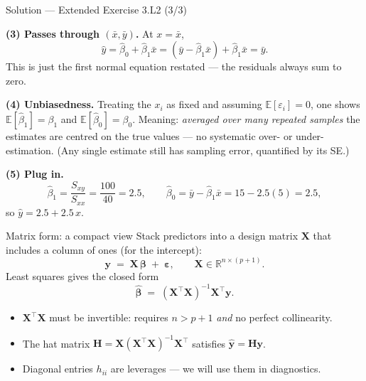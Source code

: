 \documentclass[aspectratio=169,11pt]{beamer}
\begin{document}
\begin{frame}{Solution --- Extended Exercise 3.L2 (3/3)}
  \begin{solutionbox}
    \textbf{(3) Passes through $(\bar x,\bar y)$.} At $x=\bar x$,
    \[
      \hat y=\hat\beta_0+\hat\beta_1\bar x
      =(\bar y-\hat\beta_1\bar x)+\hat\beta_1\bar x=\bar y.
    \]
    This is just the first normal equation restated --- the residuals
    always sum to zero.

    \textbf{(4) Unbiasedness.} Treating the $x_i$ as fixed and assuming
    $\mathbb{E}[\varepsilon_i]=0$, one shows $\mathbb{E}[\hat\beta_1]=\beta_1$
    and $\mathbb{E}[\hat\beta_0]=\beta_0$. Meaning: \emph{averaged over
    many repeated samples} the estimates are centred on the true values
    --- no systematic over- or under-estimation. (Any single estimate
    still has sampling error, quantified by its SE.)

    \textbf{(5) Plug in.}
    \[
      \hat\beta_1=\frac{S_{xy}}{S_{xx}}=\frac{100}{40}=2.5,\qquad
      \hat\beta_0=\bar y-\hat\beta_1\bar x=15-2.5(5)=2.5,
    \]
    so $\hat y=2.5+2.5\,x$.
  \end{solutionbox}
\end{frame}

\begin{frame}{Matrix form: a compact view}
  Stack predictors into a design matrix $\mathbf{X}$ that includes a
  column of ones (for the intercept):
  \[
    \mathbf{y} \;=\; \mathbf{X}\,\boldsymbol\beta \;+\; \boldsymbol\varepsilon,
    \qquad
    \mathbf{X} \in \mathbb{R}^{n \times (p+1)}.
  \]
  Least squares gives the closed form
  \[
    \boxed{\;
      \hat{\boldsymbol\beta}
        \;=\; (\mathbf{X}^\top \mathbf{X})^{-1}\mathbf{X}^\top \mathbf{y}.
    \;}
  \]
  \begin{readme}
    \begin{itemize}
      \item $\mathbf{X}^\top\mathbf{X}$ must be invertible: requires
            $n > p + 1$ \emph{and} no perfect collinearity.
      \item The hat matrix $\mathbf{H} = \mathbf{X}(\mathbf{X}^\top\mathbf{X})^{-1}\mathbf{X}^\top$
            satisfies $\hat{\mathbf{y}} = \mathbf{H}\mathbf{y}$.
      \item Diagonal entries $h_{ii}$ are leverages --- we will use
            them in diagnostics.
    \end{itemize}
  \end{readme}
\end{frame}
\end{document}
